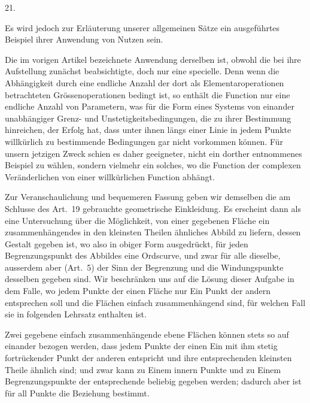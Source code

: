 \documentclass[a4paper,12pt]{article}
\begin{document}
\medbreak

\centerline{21.}

\nobreak\medskip

Es wird jedoch zur Erl\"{a}uterung unserer allgemeinen S\"{a}tze
ein ausgef\"{u}hrtes Beispiel ihrer Anwendung von Nutzen sein.

Die im vorigen Artikel bezeichnete Anwendung derselben ist,
obwohl die bei ihre Aufstellung zun\"{a}chst beabsichtigte, doch
nur eine specielle.  Denn wenn die Abh\"{a}ngigkeit durch eine
endliche Anzahl der dort als Elementaroperationen betrachteten
Gr\"{o}ssenoperationen bedingt ist, so enth\"{a}lt die Function
nur eine endliche Anzahl von Parametern, was f\"{u}r die Form
eines Systems von einander unabh\"{a}ngiger Grenz- und
Unstetigkeitsbedingungen, die zu ihrer Bestimmung hinreichen, der
Erfolg hat, dass unter ihnen l\"{a}ngs einer Linie in jedem
Punkte willk\"{u}rlich zu bestimmende Bedingungen gar nicht
vorkommen k\"{o}nnen.  F\"{u}r unsern jetzigen Zweck schien es
daher geeigneter, nicht ein dorther entnommenes Beispiel zu
w\"{a}hlen, sondern vielmehr ein solches, wo die Function der
complexen Ver\"{a}nderlichen von einer willk\"{u}rlichen Function
abh\"{a}ngt.

Zur Veranschaulichung und bequemeren Fassung geben wir demselben
die am Schlusse des Art.~19 gebrauchte geometrische Einkleidung.
Es erscheint dann als eine Untersuchung \"{u}ber die
M\"{o}glichkeit, von einer gegebenen Fl\"{a}che ein
zusammenh\"{a}ngendes in den kleinsten Theilen \"{a}hnliches
Abbild zu liefern, dessen Gestalt gegeben ist, wo also in obiger
Form ausgedr\"{u}ckt, f\"{u}r jeden Begrenzungspunkt des Abbildes
eine Ordscurve, und zwar f\"{u}r alle dieselbe, ausserdem aber
(Art.~5) der Sinn der Begrenzung und die Windungspunkte desselben
gegeben sind.  Wir beschr\"{a}nken uns auf die L\"{o}sung dieser
Aufgabe in dem Falle, wo jedem Punkte der einen Fl\"{a}che nur
Ein Punkt der andern entsprechen soll und die Fl\"{a}chen einfach
zusammenh\"{a}ngend sind, f\"{u}r welchen Fall sie in folgenden
Lehrsatz enthalten ist.

Zwei gegebene einfach zusammenh\"{a}ngende ebene Fl\"{a}chen
k\"{o}nnen stets so auf einander bezogen werden, dass jedem
Punkte der einen Ein mit ihm stetig fortr\"{u}ckender Punkt der
anderen entspricht und ihre entsprechenden kleinsten Theile
\"{a}hnlich sind; und zwar kann zu Einem innern Punkte und zu
Einem Begrenzungspunkte der entsprechende beliebig gegeben
werden; dadurch aber ist f\"{u}r all Punkte die Beziehung
bestimmt.
\end{document}
